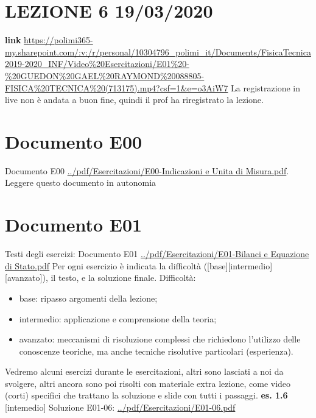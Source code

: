 \section*{LEZIONE 6 19/03/2020}
\textbf{link} \url{https://polimi365-my.sharepoint.com/:v:/r/personal/10304796_polimi_it/Documents/FisicaTecnica2019-2020_INF/Video%20Esercitazioni/E01%20-%20GUEDON%20GAEL%20RAYMOND%20088805-FISICA%20TECNICA%20(713175).mp4?csf=1&e=o3AiW7}\newline
La registrazione in live non è andata a buon fine, quindi il prof ha riregistrato la lezione.
\section*{Documento E00}
Documento E00 \url{../pdf/Esercitazioni/E00-Indicazioni e Unita di Misura.pdf}.\newline
\newline
Leggere questo documento in autonomia
\section*{Documento E01}
Testi degli esercizi:\newline
Documento E01 \url{../pdf/Esercitazioni/E01-Bilanci e Equazione di Stato.pdf}\newline
\newline
Per ogni esercizio è indicata la difficoltà ([base][intermedio][avanzato]), il testo, e la soluzione finale.\newline
Difficoltà:
\begin{itemize}
    \item base: ripasso argomenti della lezione;
    \item intermedio: applicazione e comprensione della teoria;
    \item avanzato: meccanismi di risoluzione complessi che richiedono l'utilizzo delle conoscenze teoriche, ma anche tecniche risolutive particolari (esperienza).
\end{itemize}
Vedremo alcuni esercizi durante le esercitazioni, altri sono lasciati a noi da svolgere, altri ancora sono poi risolti con materiale extra lezione, come video (corti) specifici che trattano la soluzione e slide con tutti i passaggi.\newline
\newline
\textbf{es. 1.6} [intemedio]\newline
Soluzione E01-06: \url{../pdf/Esercitazioni/E01-06.pdf}